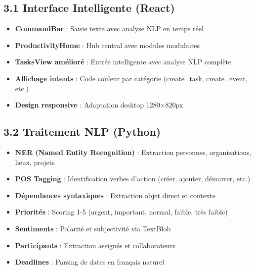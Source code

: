 \documentclass[12pt,french]{article}
\begin{document}
\subsection*{3.1 Interface Intelligente (React)}
\begin{itemize}
    \item \textbf{CommandBar} : Saisie texte avec analyse NLP en temps réel
    \item \textbf{ProductivityHome} : Hub central avec modules modulaires
    \item \textbf{TasksView amélioré} : Entrée intelligente avec analyse NLP complète
    \item \textbf{Affichage intents} : Code couleur par catégorie (create\_task, create\_event, etc.)
    \item \textbf{Design responsive} : Adaptation desktop 1280×820px
\end{itemize}

\subsection*{3.2 Traitement NLP (Python)}
\begin{itemize}
    \item \textbf{NER (Named Entity Recognition)} : Extraction personnes, organisations, lieux, projets
    \item \textbf{POS Tagging} : Identification verbes d'action (créer, ajouter, démarrer, etc.)
    \item \textbf{Dépendances syntaxiques} : Extraction objet direct et contexte
    \item \textbf{Priorités} : Scoring 1-5 (urgent, important, normal, faible, très faible)
    \item \textbf{Sentiments} : Polarité et subjectivité via TextBlob
    \item \textbf{Participants} : Extraction assignés et collaborateurs
    \item \textbf{Deadlines} : Parsing de dates en français naturel
\end{itemize}
\end{document}
